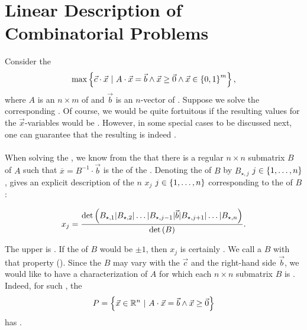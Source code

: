 \section{Linear Description of Combinatorial Problems}
Consider the 
\begin{equation}
\max\left\{ \vec{c}\cdot\vec{x}\ |\ A\cdot\vec{x}=\vec{b}\wedge\vec{x}\geq\vec{0}\wedge\vec{x}\in\left\{ 0,1 \right\}^m \right\},
\end{equation}
where $A$ is an $n\times m$  of  and $\vec{b}$ is an $n$-vector of . Suppose we solve the corresponding . Of course, we would be quite fortuitous if the resulting values for the $\vec{x}$-variables would be . However, in some special cases to be discussed next, one can guarantee that the resulting  is indeed .

\paragraph{}
When solving the , we know from the  that there is a regular $n\times n$ submatrix $B$ of $A$ such that $\overline{x}=B^{-1}\cdot\vec{b}$ is the  of the . Denoting the  of $B$ by $B_{\star,j}$ $j\in\left\{ 1,\ldots,n \right\}$,  gives an explicit description of the $n$  $x_j$ $j\in\left\{ 1,\ldots,n \right\}$ corresponding to the  of $B$:

\begin{equation}
x_j=\displaystyle\frac{\mbox{det}\left( B_{\star,1}|B_{\star,2}|\ldots|B_{\star,j-1}|\vec{b}|B_{\star,j+1}|\ldots|B_{\star,n} \right)}{\mbox{det}\left( B \right)}.
\end{equation}

The upper  is . If the  of $B$ would be $\pm 1$, then $x_j$ is certainly . We call a  $B$ with that property  (). Since the  $B$ may vary with the  $\vec{c}$ and the right-hand side $\vec{b}$, we would like to have a characterization of  $A$ for which each $n\times n$ submatrix $B$ is . Indeed, for such , the 
\begin{equation}
P=\left\{ \vec{x}\in\mathbb{R}^n\ |\ A\cdot\vec{x}=\vec{b}\wedge\vec{x}\geq\vec{0} \right\}
\end{equation}
has .

